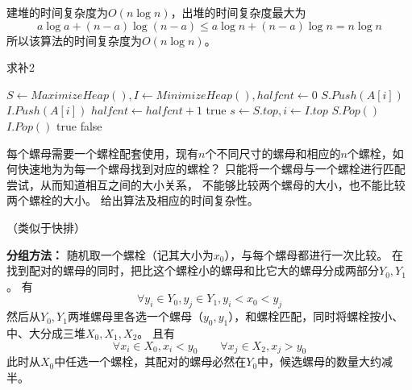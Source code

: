 \begin{questions}
\begin{solution}
        建堆的时间复杂度为$O(n \log n)$，出堆的时间复杂度最大为\[
            a \log a + (n-a) \log (n-a) \le a \log n + (n-a) \log n = n \log n
        \]
        所以该算法的时间复杂度为$O(n\log n)$。

        \begin{algorithm}[H]
            \caption{求补2}\label{0330:Composite2}
            \begin{algorithmic}[1]
                \State $S \gets MaximizeHeap(), I \gets MinimizeHeap(), halfcnt \gets 0$
                 
                \State $S.Push(A[i])$
                \State $I.Push(A[i])$
                \Else {}
                \State $halfcnt \gets halfcnt + 1$
                \EndIf
                \EndFor
                 
                \State \Return \textsf{true}
                \EndIf
                 
                \State $s \gets S.top, i \gets I.top$ 
                \State $S.Pop()$
                \State $I.Pop()$
                \Else {}
                \State \Return \textsf{true}
                \EndIf
                \EndWhile
                \State \Return \textsf{false}
            \end{algorithmic}
        \end{algorithm}
    \end{solution}

    \question 每个螺母需要一个螺栓配套使用，现有$n$个不同尺寸的螺母和相应的$n$个螺栓，如何快速地为为每一个螺母找到对应的螺栓？
    只能将一个螺母与一个螺栓进行匹配尝试，从而知道相互之间的大小关系，
    不能够比较两个螺母的大小，也不能比较两个螺栓的大小。
    给出算法及相应的时间复杂性。
    \begin{solution}
        （类似于快排）

        \textbf{分组方法：}
        随机取一个螺栓（记其大小为$x_0$），与每个螺母都进行一次比较。
        在找到配对的螺母的同时，把比这个螺栓小的螺母和比它大的螺母分成两部分$Y_0, Y_1$。
        有\[
            \forall y_i \in Y_0, y_j \in Y_1,  y_i < x_0 < y_j
        \]
        然后从$Y_0, Y_1$两堆螺母里各选一个螺母（$y_0, y_1$），和螺栓匹配，同时将螺栓按小、中、大分成三堆$X_0, X_1, X_2$。
        且有\[
            \forall x_i \in X_0, x_i < y_0  \quad\quad \forall x_j \in X_2, x_j > y_0
        \]
        此时从$X_0$中任选一个螺栓，其配对的螺母必然在$Y_0$中，候选螺母的数量大约减半。


\end{solution}
\end{questions}
